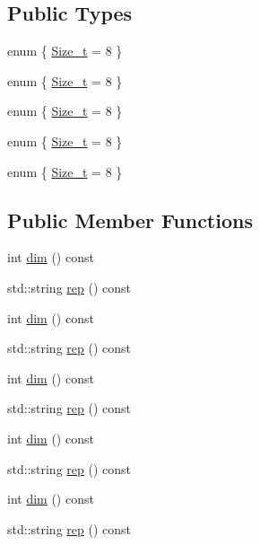 \subsection*{Public Types}
\begin{DoxyCompactItemize}
\item 
enum \{ \mbox{\hyperlink{structHadron_1_1J7o2Rep_a98b72a151106e2abc0c0f23d35b36899ade6da0350f71a39a43a346c50b6b5cb4}{Size\+\_\+t}} = 8
 \}
\item 
enum \{ \mbox{\hyperlink{structHadron_1_1J7o2Rep_a98b72a151106e2abc0c0f23d35b36899ade6da0350f71a39a43a346c50b6b5cb4}{Size\+\_\+t}} = 8
 \}
\item 
enum \{ \mbox{\hyperlink{structHadron_1_1J7o2Rep_a98b72a151106e2abc0c0f23d35b36899ade6da0350f71a39a43a346c50b6b5cb4}{Size\+\_\+t}} = 8
 \}
\item 
enum \{ \mbox{\hyperlink{structHadron_1_1J7o2Rep_a98b72a151106e2abc0c0f23d35b36899ade6da0350f71a39a43a346c50b6b5cb4}{Size\+\_\+t}} = 8
 \}
\item 
enum \{ \mbox{\hyperlink{structHadron_1_1J7o2Rep_a98b72a151106e2abc0c0f23d35b36899ade6da0350f71a39a43a346c50b6b5cb4}{Size\+\_\+t}} = 8
 \}
\end{DoxyCompactItemize}
\subsection*{Public Member Functions}
\begin{DoxyCompactItemize}
\item 
int \mbox{\hyperlink{structHadron_1_1J7o2Rep_a0134ed51bb5cad59f0a552c5bc472765}{dim}} () const
\item 
std\+::string \mbox{\hyperlink{structHadron_1_1J7o2Rep_a7fe87890d8fa36768f1a09f929f26b9c}{rep}} () const
\item 
int \mbox{\hyperlink{structHadron_1_1J7o2Rep_a0134ed51bb5cad59f0a552c5bc472765}{dim}} () const
\item 
std\+::string \mbox{\hyperlink{structHadron_1_1J7o2Rep_a7fe87890d8fa36768f1a09f929f26b9c}{rep}} () const
\item 
int \mbox{\hyperlink{structHadron_1_1J7o2Rep_a0134ed51bb5cad59f0a552c5bc472765}{dim}} () const
\item 
std\+::string \mbox{\hyperlink{structHadron_1_1J7o2Rep_a7fe87890d8fa36768f1a09f929f26b9c}{rep}} () const
\item 
int \mbox{\hyperlink{structHadron_1_1J7o2Rep_a0134ed51bb5cad59f0a552c5bc472765}{dim}} () const
\item 
std\+::string \mbox{\hyperlink{structHadron_1_1J7o2Rep_a7fe87890d8fa36768f1a09f929f26b9c}{rep}} () const
\item 
int \mbox{\hyperlink{structHadron_1_1J7o2Rep_a0134ed51bb5cad59f0a552c5bc472765}{dim}} () const
\item 
std\+::string \mbox{\hyperlink{structHadron_1_1J7o2Rep_a7fe87890d8fa36768f1a09f929f26b9c}{rep}} () const
\end{DoxyCompactItemize}


